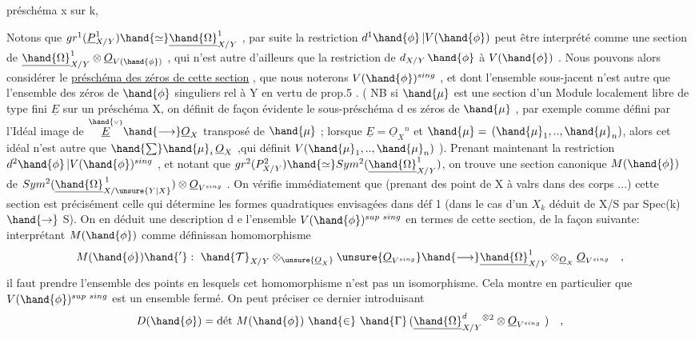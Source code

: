 
préschéma x sur k, 


Notons que $gr^1(\underline{P}^1_{X/Y}) \hand{\simeq} \underline{\hand{\Omega}}^1_{X/Y}$ , par suite la restriction
$d^1\hand{\phi}\,|V(\hand{\phi})$ peut être interprété comme une section de $\underline{\hand{\Omega}}^1_{X/Y} \otimes \underline{O}_{V(\hand{\phi})}$ ,
qui n'est autre d'ailleurs que la restriction de $d_{X/Y}\,\hand{\phi}$ à $V(\hand{\phi})$ . Nous
pouvons alors considérer le \uline{préschéma des zéros de cette section} , que
nous noterons $V(\hand{\phi})^{sing}$ , et dont l'ensemble sous-jacent n'est autre
que l'ensemble des zéros de $\hand{\phi}$ singuliers rel à Y en vertu de prop.5 .
( NB si  $\hand{\mu}$ est une section d'un Module localement libre de type fini $\underline{E}$ sur un
\placedmargin{$\|$}préschéma  X, on définit de façon évidente le sous-préschéma d es
zéros de $\hand{\mu}$ , par exemple comme défini par l'Idéal image de $\overset{\hand{\scriptscriptstyle\vee}}{\underline{E}} \hand{\longrightarrow} \underline{O}_X$
transposé de $\hand{\mu}$ ; lorsque $\underline{E} = \underline{O}_X{}^n$ et $\hand{\mu} = \,(\hand{\mu}_1,..,\hand{\mu}_n)$, alors cet
idéal n'est autre que $\hand{\sum} \hand{\mu}_i\,\underline{O}_X$ ,qui définit $V(\hand{\mu}_1,..,\hand{\mu}_n)$ ). Prenant
maintenant la restriction $d^2\hand{\phi}\,|V(\hand{\phi})^{sing}$ , et notant que
$gr^2(P^2_{X/Y}) \hand{\simeq} Sym^2(\underline{\hand{\Omega}}^1_{X/Y})$, on trouve une section canonique $M(\hand{\phi})$ de
$Sym^2(\underline{\hand{\Omega}}^{\,1}_{X/\unsure{Y|X}}) \otimes \underline{O}_{V^{sing}}$ . On vérifie immédiatement que (prenant des
\placedmargin{$\|$}point de X à valrs dans des corps ...) cette section est précisément
celle qui détermine les formes quadratiques envisagées dans déf 1
(dans le cas  d'un $X_k$ déduit de X/S par Spec(k)$\hand{\rightarrow}$ S). On
en déduit une description d e l'ensemble $V(\hand{\phi})^{sup\ sing}$ en termes de
cette section, de la façon suivante: interprétant $M(\hand{\phi})$ comme définissan
homomorphisme
\[
M(\hand{\phi})\hand{'} : \ \hand{\mathcal{T}}_{X/Y} \otimes_{\unsure{\underline{O}_X}} \unsure{\underline{O}_{V^{sing}}} \hand{\longrightarrow} \underline{\hand{\Omega}}^1_{X/Y} \otimes_{\underline{O}_X} \underline{O}_{V^{sing}} \quad ,
\]
il faut prendre l'ensemble des points en lesquels cet homomorphisme
n'est pas un isomorphisme. Cela montre en particulier que $V(\hand{\phi})^{sup\ sing}$
est un ensemble fermé. On peut  préciser ce dernier introduisant
\[
D(\hand{\phi}) = \text{dét}\ M(\hand{\phi}) \ \hand{\in} \ \hand{\Gamma}\,(\underline{\hand{\Omega}}^d_{X/Y}{}^{\otimes 2} \otimes \underline{O}_{V^{sing}}\ ) \quad ,
\]

